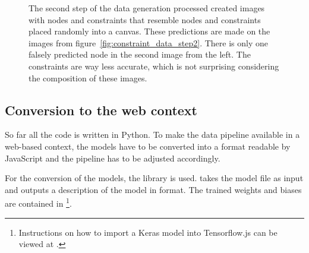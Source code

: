 \begin{figure}
\begin{subfigure}[b]{0.19\textwidth}
    \end{subfigure}
    \begin{subfigure}[b]{0.19\textwidth}
    \end{subfigure}
    \caption[Predictions of the first prototype on the generated data]{The second step of the data generation processed created images with nodes and constraints that resemble nodes and constraints placed randomly into a canvas. These predictions are made on the images from figure~\ref{fig:constraint_data_step2}. There is only one falsely predicted node in the second image from the left. The constraints are way less accurate, which is not surprising considering the composition of these images.}\label{fig:constraint_data_step3}
\end{figure}

\subsection{Conversion to the web context}\label{ch:conversion_to_web_context}

So far all the code is written in Python.
To make the data pipeline available in a web-based context, the models have to be converted into a format readable by JavaScript and the pipeline has to be adjusted accordingly.

For the conversion of the models, the library  %
is used.
 takes the model file as input and outputs a description of the model in  format.
The trained weights and biases are contained in \footnote{Instructions on how to import a Keras model into Tensorflow.js can be viewed at .}.

